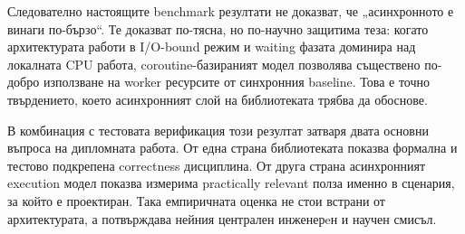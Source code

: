 Следователно настоящите benchmark резултати не доказват, че „асинхронното е винаги по-бързо“. Те доказват по-тясна, но по-научно защитима теза: когато архитектурата работи в I/O-bound режим и waiting фазата доминира над локалната CPU работа, coroutine-базираният модел позволява съществено по-добро използване на worker ресурсите от синхронния baseline. Това е точно твърдението, което асинхронният слой на библиотеката трябва да обоснове.

В комбинация с тестовата верификация този резултат затваря двата основни въпроса на дипломната работа. От една страна библиотеката показва формална и тестово подкрепена correctness дисциплина. От друга страна асинхронният execution модел показва измерима practically relevant полза именно в сценария, за който е проектиран. Така емпиричната оценка не стои встрани от архитектурата, а потвърждава нейния централен инженерeн и научен смисъл.
